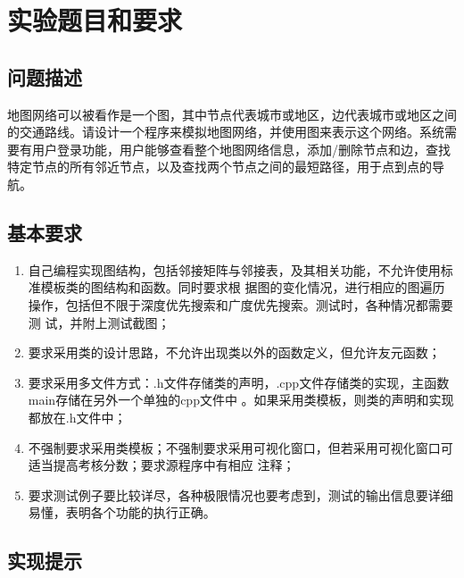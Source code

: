 \documentclass[UTF8,12pt,a4paper]{ctexart}
\begin{document}


\tableofcontents
\newpage

\section{实验题目和要求}

\subsection{问题描述}

地图网络可以被看作是一个图，其中节点代表城市或地区，边代表城市或地区之间的交通路线。请设计一个程序来模拟地图网络，并使用图来表示这个网络。系统需要有用户登录功能，用户能够查看整个地图网络信息，添加/删除节点和边，查找特定节点的所有邻近节点，以及查找两个节点之间的最短路径，用于点到点的导航。

\subsection{基本要求}

\begin{enumerate}[label=（\arabic*）, leftmargin=2em, itemsep=0.6em]
  \item 自己编程实现图结构，包括邻接矩阵与邻接表，及其相关功能，不允许使用标准模板类的图结构和函数。同时要求根         据图的变化情况，进行相应的图遍历操作，包括但不限于深度优先搜索和广度优先搜索。测试时，各种情况都需要测         试，并附上测试截图；
  \item 要求采用类的设计思路，不允许出现类以外的函数定义，但允许友元函数；
  \item 要求采用多文件方式：.h文件存储类的声明，.cpp文件存储类的实现，主函数main存储在另外一个单独的cpp文件中        。如果采用类模板，则类的声明和实现都放在.h文件中；
  \item 不强制要求采用类模板；不强制要求采用可视化窗口，但若采用可视化窗口可适当提高考核分数；要求源程序中有相应       注释；
  \item 要求测试例子要比较详尽，各种极限情况也要考虑到，测试的输出信息要详细易懂，表明各个功能的执行正确。
\end{enumerate}

\subsection{实现提示}
\end{document}
